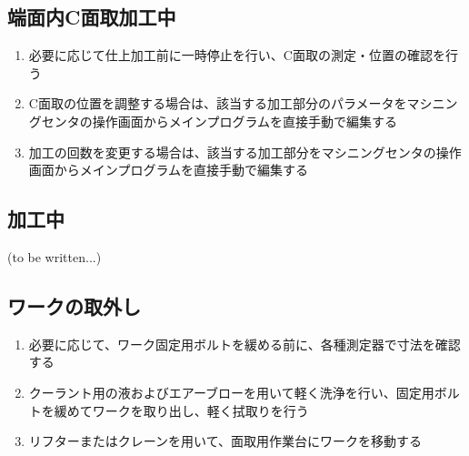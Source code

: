 \clearpage
\subsection{端面内C面取加工中}
\begin{enumerate}
\item 必要に応じて仕上加工前に一時停止を行い、C面取の測定・位置の確認を行う
\item C面取の位置を調整する場合は、該当する加工部分のパラメータをマシニングセンタの操作画面からメインプログラムを直接手動で編集する
\item {}加工の回数を変更する場合は、該当する加工部分をマシニングセンタの操作画面からメインプログラムを直接手動で編集する
\end{enumerate}


\subsection{\TanmenZaguri 加工中\TBW}
(to be written...)



\clearpage


\subsection{ワークの取外し}
\begin{enumerate}
\item 必要に応じて、ワーク固定用ボルトを緩める前に、各種測定器で寸法を確認する
\item クーラント用の液およびエアーブローを用いて軽く洗浄を行い、固定用ボルトを緩めてワークを取り出し、軽く拭取りを行う
\item {}リフターまたはクレーンを用いて、面取用作業台にワークを移動する
\end{enumerate}


